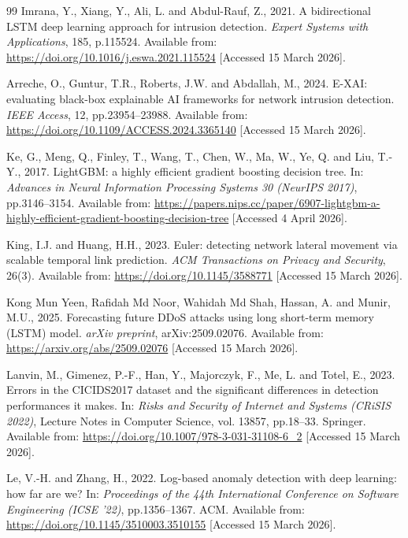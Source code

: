 \documentclass[12pt,a4paper]{report}
\begin{document}
\begin{thebibliography}{99}
Imrana, Y., Xiang, Y., Ali, L. and Abdul-Rauf, Z., 2021. A bidirectional LSTM deep learning approach for intrusion detection. \textit{Expert Systems with Applications}, 185, p.115524. Available from: \url{https://doi.org/10.1016/j.eswa.2021.115524} [Accessed 15 March 2026].

Arreche, O., Guntur, T.R., Roberts, J.W. and Abdallah, M., 2024. E-XAI: evaluating black-box explainable AI frameworks for network intrusion detection. \textit{IEEE Access}, 12, pp.23954--23988. Available from: \url{https://doi.org/10.1109/ACCESS.2024.3365140} [Accessed 15 March 2026].

Ke, G., Meng, Q., Finley, T., Wang, T., Chen, W., Ma, W., Ye, Q. and Liu, T.-Y., 2017. LightGBM: a highly efficient gradient boosting decision tree. In: \textit{Advances in Neural Information Processing Systems 30 (NeurIPS 2017)}, pp.3146--3154. Available from: \url{https://papers.nips.cc/paper/6907-lightgbm-a-highly-efficient-gradient-boosting-decision-tree} [Accessed 4 April 2026].

King, I.J. and Huang, H.H., 2023. Euler: detecting network lateral movement via scalable temporal link prediction. \textit{ACM Transactions on Privacy and Security}, 26(3). Available from: \url{https://doi.org/10.1145/3588771} [Accessed 15 March 2026].

Kong Mun Yeen, Rafidah Md Noor, Wahidah Md Shah, Hassan, A. and Munir, M.U., 2025. Forecasting future DDoS attacks using long short-term memory (LSTM) model. \textit{arXiv preprint}, arXiv:2509.02076. Available from: \url{https://arxiv.org/abs/2509.02076} [Accessed 15 March 2026].

Lanvin, M., Gimenez, P.-F., Han, Y., Majorczyk, F., Me, L. and Totel, E., 2023. Errors in the CICIDS2017 dataset and the significant differences in detection performances it makes. In: \textit{Risks and Security of Internet and Systems (CRiSIS 2022)}, Lecture Notes in Computer Science, vol. 13857, pp.18--33. Springer. Available from: \url{https://doi.org/10.1007/978-3-031-31108-6_2} [Accessed 15 March 2026].

Le, V.-H. and Zhang, H., 2022. Log-based anomaly detection with deep learning: how far are we? In: \textit{Proceedings of the 44th International Conference on Software Engineering (ICSE '22)}, pp.1356--1367. ACM. Available from: \url{https://doi.org/10.1145/3510003.3510155} [Accessed 15 March 2026].


\end{thebibliography}
\end{document}
